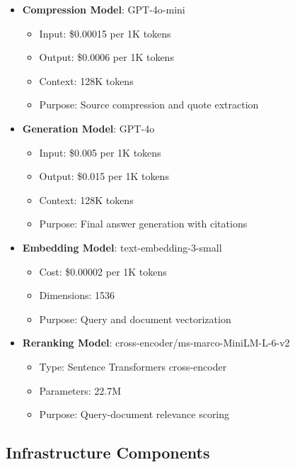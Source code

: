 \documentclass[11pt,a4paper]{article}
\begin{document}
\begin{itemize}
    \item \textbf{Compression Model}: GPT-4o-mini
    \begin{itemize}
        \item Input: \$0.00015 per 1K tokens
        \item Output: \$0.0006 per 1K tokens
        \item Context: 128K tokens
        \item Purpose: Source compression and quote extraction
    \end{itemize}
    
    \item \textbf{Generation Model}: GPT-4o
    \begin{itemize}
        \item Input: \$0.005 per 1K tokens
        \item Output: \$0.015 per 1K tokens
        \item Context: 128K tokens
        \item Purpose: Final answer generation with citations
    \end{itemize}
    
    \item \textbf{Embedding Model}: text-embedding-3-small
    \begin{itemize}
        \item Cost: \$0.00002 per 1K tokens
        \item Dimensions: 1536
        \item Purpose: Query and document vectorization
    \end{itemize}
    
    \item \textbf{Reranking Model}: cross-encoder/ms-marco-MiniLM-L-6-v2
    \begin{itemize}
        \item Type: Sentence Transformers cross-encoder
        \item Parameters: 22.7M
        \item Purpose: Query-document relevance scoring
    \end{itemize}
\end{itemize}

\subsection{Infrastructure Components}
\end{document}
